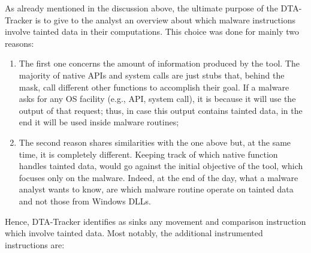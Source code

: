 \documentclass[LaM,binding=0.6cm]{sapthesis}
\begin{document}
As already mentioned in the discussion above, the ultimate purpose of the {\sf DTA-Tracker} is to give to the analyst an overview about which malware instructions involve tainted data in their computations. This choice was done for mainly two reasons:
\begin{enumerate}
\item The first one concerns the amount of information produced by the tool. The majority of native APIs and system calls are just stubs that, behind the mask, call different other functions to accomplish their goal. If a malware asks for any OS facility (e.g., API, system call), it is because it will use the output of that request; thus, in case this output contains tainted data, in the end it will be used inside malware routines;
\item The second reason shares similarities with the one above but, at the same time, it is completely different. Keeping track of which native function handles tainted data, would go against the initial objective of the tool, which focuses only on the malware. Indeed, at the end of the day, what a malware analyst wants to know, are which malware routine operate on tainted data and not those from Windows DLLs.
\end{enumerate}
Hence, {\sf DTA-Tracker} identifies as sinks any movement and comparison instruction which involve tainted data. Most notably, the additional instrumented instructions are:
\end{document}
